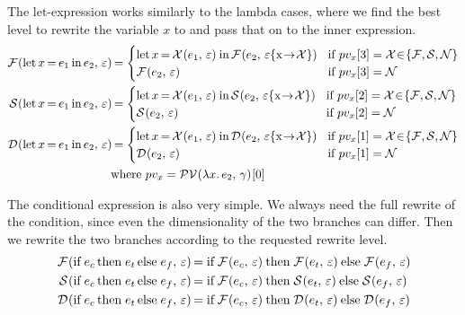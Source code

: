 \documentclass[../main.tex]{subfiles}
\begin{document}
The let-expression works similarly to the lambda cases, where we find the best level to rewrite the variable $x$ to and pass that on to the inner expression.
\begin{align*}
    \reduce{F}{\letexpr{x}{e_1}{e_2}} &= \begin{cases}
            \letexpr{x}{\reduce{X}{e_1}}{\reduce[\envmap{\varepsilon}{x}{\X}]{F}{e_2}}
                &\text{if } pv_x[3] = \X\hspace{-2pt} \in\hspace{-2pt} \{ \F,\S,\N \} \\
            \reduce{F}{e_2}
                &\text{if } pv_x[3] = \N
        \end{cases} \\
    \reduce{S}{\letexpr{x}{e_1}{e_2}} &= \begin{cases}
            \letexpr{x}{\reduce{X}{e_1}}{\reduce[\envmap{\varepsilon}{x}{\X}]{S}{e_2}}
                &\text{if } pv_x[2] = \X\hspace{-2pt} \in\hspace{-2pt} \{ \F,\S,\N \} \\
            \reduce{S}{e_2}
                &\text{if } pv_x[2] = \N
        \end{cases} \\
    \reduce{D}{\letexpr{x}{e_1}{e_2}} &= \begin{cases}
            \letexpr{x}{\reduce{X}{e_1}}{\reduce[\envmap{\varepsilon}{x}{\X}]{D}{e_2}}
                &\text{if } pv_x[1] = \X\hspace{-2pt} \in\hspace{-2pt} \{ \F,\S,\N \} \\
            \reduce{D}{e_2}
                &\text{if } pv_x[1] = \N
        \end{cases} \\
        &\text{where } pv_x = \pv{\lambdaexpr{x}{e_2}}[0]
\end{align*}

The conditional expression is also very simple. We always need the full rewrite of the condition, since even the dimensionality of the two branches can differ. Then we rewrite the two branches according to the requested rewrite level.
\begin{align*}
    \reduce{F}{\condexpr{e_c}{e_t}{e_f}}
        &= \condexpr{\reduce{F}{e_c}}{\reduce{F}{e_t}}{\reduce{F}{e_f}} \\
    \reduce{S}{\condexpr{e_c}{e_t}{e_f}}
        &= \condexpr{\reduce{F}{e_c}}{\reduce{S}{e_t}}{\reduce{S}{e_f}} \\
    \reduce{D}{\condexpr{e_c}{e_t}{e_f}}
        &= \condexpr{\reduce{F}{e_c}}{\reduce{D}{e_t}}{\reduce{D}{e_f}}
\end{align*}
\end{document}

